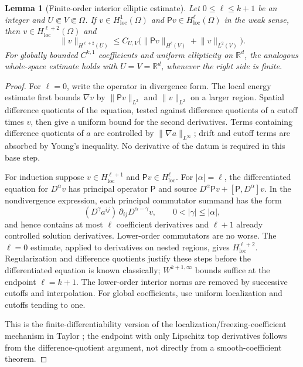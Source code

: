 \documentclass[11pt,a4paper]{article}
\newtheorem{lemma}[theorem]{Lemma}
\theoremstyle{definition}\newtheorem{definition}{Definition}[section]\newtheorem{example}[theorem]{Example}
\theoremstyle{remark}\newtheorem{remark}[theorem]{Remark}\newtheorem{remarkSix}{Remark}[section]
\newcommand{\Rd}{\mathbb R^d}
\newcommand{\loc}{\mathrm{loc}}
\newcommand{\norm}[1]{\lVert #1\rVert}
\begin{document}
\begin{lemma}[Finite-order interior elliptic estimate]\label{lem:elliptic6}
Let $0\le\ell\le k+1$ be an integer and $U\Subset V\Subset\Omega$. If $v\in H^1_{\loc}(\Omega)$ and $\mathsf Pv\in H^\ell_{\loc}(\Omega)$ in the weak sense, then $v\in H^{\ell+2}_{\loc}(\Omega)$ and
\begin{equation}\label{eq:ellipticB6}
 \norm v_{H^{\ell+2}(U)}\le C_{U,V}
 \bigl(\norm{\mathsf Pv}_{H^\ell(V)}+\norm v_{L^2(V)}\bigr).
\end{equation}
For globally bounded $C^{k,1}$ coefficients and uniform ellipticity on $\Rd$, the analogous whole-space estimate holds with $U=V=\Rd$, whenever the right side is finite.
\end{lemma}
\begin{proof}
For $\ell=0$, write the operator in divergence form. The local energy estimate first bounds $\nabla v$ by $\norm{\mathsf Pv}_{L^2}$ and $\norm v_{L^2}$ on a larger region. Spatial difference quotients of the equation, tested against difference quotients of a cutoff times $v$, then give a uniform bound for the second derivatives. Terms containing difference quotients of $a$ are controlled by $\norm{\nabla a}_{L^\infty}$; drift and cutoff terms are absorbed by Young's inequality. No derivative of the datum is required in this base step.

For induction suppose $v\in H^{\ell+1}_{\loc}$ and $\mathsf Pv\in H^\ell_{\loc}$. For $|\alpha|=\ell$, the differentiated equation for $D^\alpha v$ has principal operator $\mathsf P$ and source $D^\alpha\mathsf Pv+[\mathsf P,D^\alpha]v$. In the nondivergence expression, each principal commutator summand has the form
\begin{equation}\label{eq:ellcomm6}
 (D^\gamma a^{ij})\,\partial_{ij}D^{\alpha-\gamma}v,
 \qquad 0<|\gamma|\le |\alpha|,
\end{equation}
and hence contains at most $\ell$ coefficient derivatives and $\ell+1$ already controlled solution derivatives. Lower-order commutators are no worse. The $\ell=0$ estimate, applied to derivatives on nested regions, gives $H^{\ell+2}_{\loc}$. Regularization and difference quotients justify these steps before the differentiated equation is known classically; $W^{k+1,\infty}$ bounds suffice at the endpoint $\ell=k+1$. The lower-order interior norms are removed by successive cutoffs and interpolation. For global coefficients, use uniform localization and cutoffs tending to one.

This is the finite-differentiability version of the localization/freezing-coefficient mechanism in Taylor \cite[Vol.~I, Ch.~5, \S11, Thm.~11.1]{taylorI}; the endpoint with only Lipschitz top derivatives follows from the difference-quotient argument, not directly from a smooth-coefficient theorem.
\end{proof}
\end{document}
